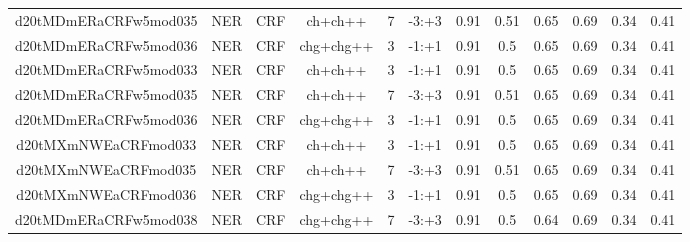 \documentclass[a4paper]{article}
\begin{document}
\begin{landscape}
\begin{center}
\begin{tabular}{ |c|c|c|c|c|c|c|c|c|c|c|c|}
 	
 
 	
 		
 		\small{ d20tMDmERaCRFw5mod035 } & NER & CRF & ch+ch++  &  7 &  -3:+3  &  0.91 & 0.51 & 0.65  &  0.69 & 0.34 & 0.41 \\
 		

 	
 
 	
 		
 		\small{ d20tMDmERaCRFw5mod036 } & NER & CRF & chg+chg++  &  3 &  -1:+1  &  0.91 & 0.5 & 0.65  &  0.69 & 0.34 & 0.41 \\
 		

 	
 
 	
 		
 		\small{ d20tMDmERaCRFw5mod033 } & NER & CRF & ch+ch++  &  3 &  -1:+1  &  0.91 & 0.5 & 0.65  &  0.69 & 0.34 & 0.41 \\
 		

 	
 
 	
 		
 		\small{ d20tMDmERaCRFw5mod035 } & NER & CRF & ch+ch++  &  7 &  -3:+3  &  0.91 & 0.51 & 0.65  &  0.69 & 0.34 & 0.41 \\
 		

 	
 
 	
 		
 		\small{ d20tMDmERaCRFw5mod036 } & NER & CRF & chg+chg++  &  3 &  -1:+1  &  0.91 & 0.5 & 0.65  &  0.69 & 0.34 & 0.41 \\
 		

 	
 
 	
 		
 		\small{ d20tMXmNWEaCRFmod033 } & NER & CRF & ch+ch++  &  3 &  -1:+1  &  0.91 & 0.5 & 0.65  &  0.69 & 0.34 & 0.41 \\
 		

 	
 
 	
 		
 		\small{ d20tMXmNWEaCRFmod035 } & NER & CRF & ch+ch++  &  7 &  -3:+3  &  0.91 & 0.51 & 0.65  &  0.69 & 0.34 & 0.41 \\
 		

 	
 
 	
 		
 		\small{ d20tMXmNWEaCRFmod036 } & NER & CRF & chg+chg++  &  3 &  -1:+1  &  0.91 & 0.5 & 0.65  &  0.69 & 0.34 & 0.41 \\
 		

 	
 
 	
 		
 		\small{ d20tMDmERaCRFw5mod038 } & NER & CRF & chg+chg++  &  7 &  -3:+3  &  0.91 & 0.5 & 0.64  &  0.69 & 0.34 & 0.41 \\
 		


\end{tabular}
\end{center}
\end{landscape}
\end{document}
